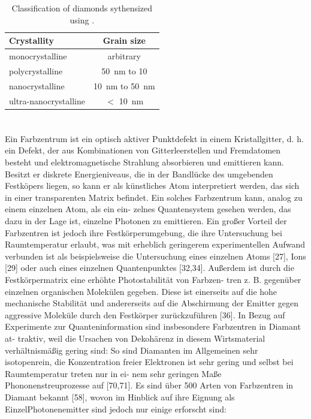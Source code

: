       \begin{table}[htbp]
    		\centering
    		\caption[Classification of diamond synthesized by \cvd]{Classification of diamonds sythensized using \CVD \cite{steinmetz::thesis}.} \label{tab::diamond_grain_sizes}
    			\begin{tabular}{lc}
    			\toprule
    			Crystallity & Grain size  \\
    			\midrule
    			monocrystalline & arbitrary \\
    			polycrystalline & \SI{50}{\nm} to \SI{10}{\mum} \\
    			nanocrystalline & \SI{10}{\nm} to \SI{50}{\nm} \\
    			ultra-nanocrystalline & $<$ \SI{10}{\nm} \\
    			\bottomrule
    			\end{tabular}
    	\end{table}


\section{\sivs} \label{sec::siv}

  Ein Farbzentrum ist ein optisch aktiver Punktdefekt in einem Kristallgitter, d. h. ein Defekt, der aus Kombinationen von Gitterleerstellen und Fremdatomen besteht und elektromagnetische Strahlung absorbieren und emittieren kann. Besitzt er diskrete Energieniveaus, die in der Bandlücke des umgebenden Festköpers liegen, so kann er als künstliches Atom interpretiert werden, das sich in einer transparenten Matrix befindet. Ein solches Farbzentrum kann, analog zu einem einzelnen Atom, als ein ein- zelnes Quantensystem gesehen werden, das dazu in der Lage ist, einzelne Photonen zu emittieren. Ein großer Vorteil der Farbzentren ist jedoch ihre Festkörperumgebung, die ihre Untersuchung bei Raumtemperatur erlaubt, was mit erheblich geringerem experimentellen Aufwand verbunden ist als beispielsweise die Untersuchung eines einzelnen Atoms [27], Ions [29] oder auch eines einzelnen Quantenpunktes [32,34]. Außerdem ist durch die Festkörpermatrix eine erhöhte Photostabilität von Farbzen- tren z. B. gegenüber einzelnen organischen Molekülen gegeben. Diese ist einerseits auf die hohe mechanische Stabilität und andererseits auf die Abschirmung der Emitter gegen aggressive Moleküle durch den Festkörper zurückzuführen [36]. In Bezug auf Experimente zur Quanteninformation sind insbesondere Farbzentren in Diamant at- traktiv, weil die Ursachen von Dekohärenz in diesem Wirtsmaterial verhältnismäßig gering sind: So sind Diamanten im Allgemeinen sehr isotopenrein, die Konzentration freier Elektronen ist sehr gering und selbst bei Raumtemperatur treten nur in ei- nem sehr geringen Maße Phononenstreuprozesse auf [70,71]. Es sind über 500 Arten von Farbzentren in Diamant bekannt [58], wovon im Hinblick auf ihre Eignung als EinzelPhotonenemitter sind jedoch nur einige erforscht sind:

